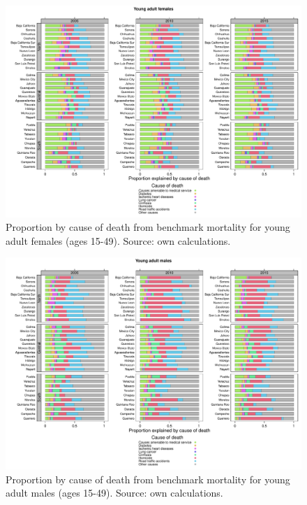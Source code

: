 \documentclass[11.5pt]{article}
\begin{document}
{\begin{figure}
\centering
\caption{Proportion by cause of death from benchmark mortality for young adult females (ages 15-49). Source: own calculations.}
\begin{center}
\includegraphics[scale=.5]{Figures/Figure_prop_yaf.pdf}
\end{center}
\end{figure}


\begin{figure}
\centering
\caption{Proportion by cause of death from benchmark mortality for young adult males (ages 15-49). Source: own calculations.}
\begin{center}
\includegraphics[scale=.5]{Figures/Figure_prop_yam.pdf}
\end{center}
\end{figure}


}
\end{document}

